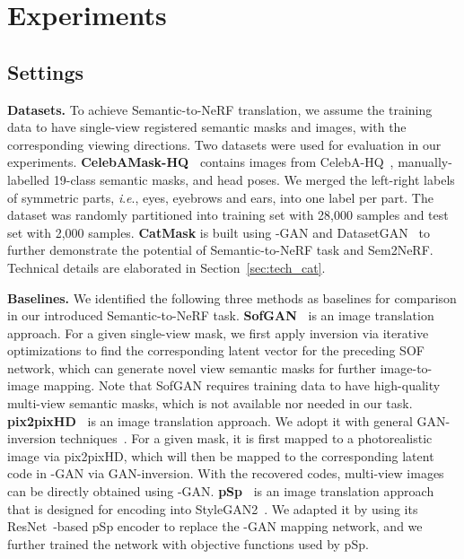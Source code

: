 \documentclass[runningheads]{llncs}
\newcommand{\ie}{\textit{i}.\textit{e}.}
\begin{document}
\section{Experiments}

\subsection{Settings}\label{sec:exp_set}



\textbf{Datasets.} To achieve Semantic-to-NeRF translation, we assume the training data to have single-view registered semantic masks and images, with the corresponding viewing directions. Two datasets were used for evaluation in our experiments.
\textbf{CelebAMask-HQ~\cite{lee2020maskgan}} contains images from CelebA-HQ~\cite{liu2015deep,karras2017progressive}, manually-labelled 19-class semantic masks, and head poses. We merged the left-right labels of symmetric parts, \ie, eyes, eyebrows and ears, into one label per part. The dataset was randomly partitioned into training set with 28,000 samples and test set with 2,000 samples.
\textbf{CatMask} is built using -GAN and DatasetGAN~\cite{zhang2021datasetgan} to further demonstrate the potential of  Semantic-to-NeRF task and  Sem2NeRF. Technical details are elaborated in Section~\ref{sec:tech_cat}. 

\noindent\textbf{Baselines.} We identified the following three methods as baselines for comparison in our introduced Semantic-to-NeRF task.
\textbf{SofGAN~\cite{chen2022sofgan}} is an image translation approach. For a given single-view mask, we first apply inversion via iterative optimizations to find the corresponding latent vector for the preceding SOF~\cite{chen2019learning} network, which can generate novel view semantic masks for further image-to-image mapping. Note that SofGAN requires training data to have high-quality multi-view semantic masks, which is not available nor needed in our task. \textbf{pix2pixHD~\cite{wang2018high}} is an image translation approach. We adopt it with general GAN-inversion techniques~\cite{chan2021pi,karras2020analyzing}. For a given mask, it is first mapped to a photorealistic image via pix2pixHD, which will then be mapped to the corresponding latent code in -GAN via GAN-inversion. With the recovered codes, multi-view images can be directly obtained using -GAN.    
\textbf{pSp~\cite{richardson2021encoding}} is an image translation approach that is designed for encoding into StyleGAN2~\cite{karras2020analyzing}. We adapted it by using its ResNet~\cite{he2016deep}-based pSp encoder to replace the -GAN mapping network, and we further trained the network with objective functions used by pSp.
\end{document}

